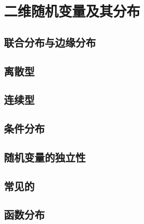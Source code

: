 \chapter{二维随机变量及其分布}

\section{联合分布与边缘分布}
\label{sec:二维随机变量的联合分布与边缘分布}

\section{离散型}
\label{sec:离散型}

\section{连续型}
\label{sec:连续型}

\section{条件分布}
\label{sec:条件分布}

\section{随机变量的独立性}
\label{sec:随机变量的独立性}

\section{常见的}
\label{sec:常见的}

\section{函数分布}
\label{sec:函数分布}
